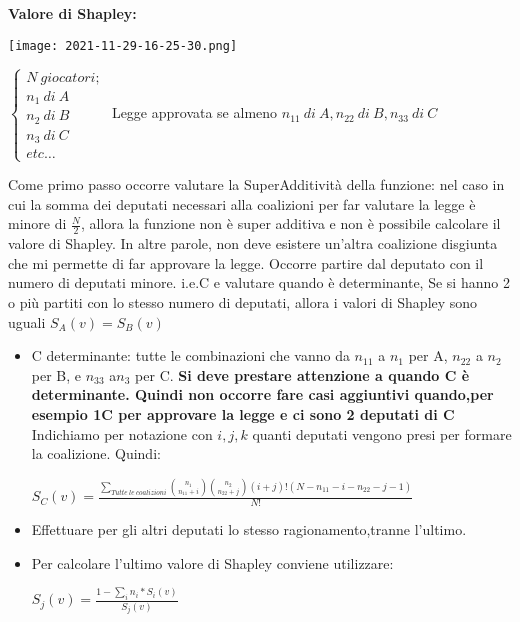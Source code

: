 \documentclass{article}
\theoremstyle{definition}
\theoremstyle{remark}
\begin{document}
\textbf{Valore di Shapley:}
\begin{center}
    \texttt{[image: 2021-11-29-16-25-30.png]}
\end{center}
\begin{center}
    $\begin{cases}
        N\ giocatori;\\
        n_1\ di\ A\\
        n_2\ di\ B\\
        n_3\ di\ C\\
        etc\dots
    \end{cases}$
    Legge approvata se almeno \(n_{11}\ di\ A, n_{22}\ di\ B, n_{33}\ di\ C\)
\end{center}
Come primo passo occorre valutare la SuperAdditività della funzione: nel caso in cui la somma dei deputati necessari alla coalizioni per far valutare la legge è minore di \(\frac{N}{2}\), allora
la funzione non è super additiva e non è possibile calcolare il valore di Shapley. In altre parole, non deve esistere un'altra coalizione disgiunta che mi permette di far approvare la legge.\newline
Occorre partire dal deputato con il numero di deputati minore. i.e.C e valutare quando è determinante,\newline
Se si hanno 2 o più partiti con lo stesso numero di deputati, allora i valori di Shapley sono uguali \(S_A(v)=S_B(v)\)
\begin{itemize}
    \item C determinante: tutte le combinazioni che vanno da \(n_11\) a \(n_1\) per A, \(n_22\) a \(n_2\) per B, e \(n_33\) a\(n_3\) per C.\newline
    \textbf{Si deve prestare attenzione a quando C è determinante. Quindi non occorre fare casi aggiuntivi quando,per esempio 1C per approvare la legge e ci sono 2 deputati di C}\newline
    Indichiamo per notazione con \(i,j,k\) quanti deputati vengono presi per formare la coalizione. Quindi:
    \begin{center}
        \(S_C(v)=\frac{\sum_{Tutte\ le\ coalizioni}\binom{n_1}{n_{11}+i}\binom{n_2}{n_{22}+j}(i+j)!(N-n_{11}-i-n_{22}-j-1) }{N!}\)
    \end{center}
    \item Effettuare per gli altri deputati lo stesso ragionamento,tranne l'ultimo.
    \item Per calcolare l'ultimo valore di Shapley conviene utilizzare:
    \begin{center}
        \(S_j(v)=\frac{1-\sum_{i}n_i*S_i(v)}{S_j(v)}\)
    \end{center}
\end{itemize}
\end{document}
